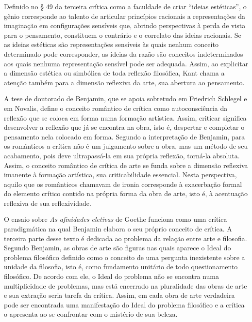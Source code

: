 Definido no § 49 da terceira crítica como a faculdade de criar ``ideias
estéticas'', o gênio corresponde ao talento de articular princípios
racionais a representações da imaginação em configurações sensíveis que,
abrindo perspectivas à perda de vista para o pensamento, constituem o
contrário e o correlato das ideias racionais. Se as ideias estéticas são
representações sensíveis às quais nenhum conceito determinado pode
corresponder, as ideias da razão são conceitos indeterminados aos quais
nenhuma representação sensível pode ser adequada. Assim, ao explicitar a
dimensão estética ou simbólica de toda reflexão filosófica, Kant chama a
atenção também para a dimensão reflexiva da arte, sua abertura ao
pensamento.

A tese de doutorado de Benjamin, que se apoia sobretudo em Friedrich
Schlegel e em Novalis, define o conceito romântico de crítica como
autoconsciência da reflexão que se coloca em forma numa formação
artística. Assim, criticar significa desenvolver a reflexão que já se
encontra na obra, isto é, despertar e completar o pensamento nela
colocado em forma. Segundo a interpretação de Benjamin, para os
românticos a crítica não é um julgamento sobre a obra, mas um método de
seu acabamento, pois deve ultrapassá-la em sua própria reflexão, torná-la
absoluta. Assim, o conceito romântico de crítica de arte se funda sobre
a dimensão reflexiva imanente à formação artística, sua criticabilidade
essencial. Nesta perspectiva, aquilo que os românticos chamavam de
ironia corresponde à exacerbação formal do elemento crítico contido na
própria forma da obra de arte, isto é, à acentuação reflexiva de sua
reflexividade.

O ensaio sobre \emph{As afinidades eletivas} de Goethe funciona como uma
crítica paradigmática na qual Benjamin elabora o seu próprio conceito de
crítica. A terceira parte desse texto é dedicada ao problema da relação
entre arte e filosofia. Segundo Benjamin, as obras de arte são figuras
nas quais aparece o Ideal do problema filosófico definido como o
conceito de uma pergunta inexistente sobre a unidade da filosofia, isto
é, como fundamento unitário de todo questionamento filosófico. De acordo
com ele, o Ideal do problema não se encontra numa multiplicidade de
problemas, mas está encerrado na pluralidade das obras de arte e sua
extração seria tarefa da crítica. Assim, em cada obra de arte verdadeira
pode ser encontrada uma manifestação do Ideal do problema filosófico e a
crítica o apresenta ao se confrontar com o mistério de sua beleza.


